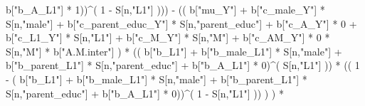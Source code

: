 \documentclass[
]{book}
\newenvironment{Shaded}{\begin{snugshade}}{\end{snugshade}}
\newcommand{\DecValTok}[1]{\textcolor[rgb]{0.00,0.00,0.81}{#1}}
\newcommand{\NormalTok}[1]{#1}
\newcommand{\SpecialCharTok}[1]{\textcolor[rgb]{0.00,0.00,0.00}{#1}}
\newcommand{\StringTok}[1]{\textcolor[rgb]{0.31,0.60,0.02}{#1}}
\begin{document}
\begin{Shaded}
\begin{Highlighting}[]
\NormalTok{                                 b[}\StringTok{"b\_A\_L1"}\NormalTok{] }\SpecialCharTok{*} \DecValTok{1}\NormalTok{))}\SpecialCharTok{\^{}}\NormalTok{( }\DecValTok{1} \SpecialCharTok{{-}}\NormalTok{ S[n,}\StringTok{"L1"}\NormalTok{] ))) }\SpecialCharTok{{-}} 
\NormalTok{                      (( b[}\StringTok{"mu\_Y"}\NormalTok{] }\SpecialCharTok{+} 
\NormalTok{                          b[}\StringTok{"c\_male\_Y"}\NormalTok{] }\SpecialCharTok{*}\NormalTok{ S[n,}\StringTok{"male"}\NormalTok{] }\SpecialCharTok{+} 
\NormalTok{                          b[}\StringTok{"c\_parent\_educ\_Y"}\NormalTok{] }\SpecialCharTok{*}\NormalTok{ S[n,}\StringTok{"parent\_educ"}\NormalTok{] }\SpecialCharTok{+} 
\NormalTok{                          b[}\StringTok{"c\_A\_Y"}\NormalTok{] }\SpecialCharTok{*} \DecValTok{0} \SpecialCharTok{+} 
\NormalTok{                          b[}\StringTok{"c\_L1\_Y"}\NormalTok{] }\SpecialCharTok{*}\NormalTok{ S[n,}\StringTok{"L1"}\NormalTok{] }\SpecialCharTok{+}
\NormalTok{                          b[}\StringTok{"c\_M\_Y"}\NormalTok{] }\SpecialCharTok{*}\NormalTok{ S[n,}\StringTok{"M"}\NormalTok{] }\SpecialCharTok{+}
\NormalTok{                          b[}\StringTok{"c\_AM\_Y"}\NormalTok{] }\SpecialCharTok{*} \DecValTok{0} \SpecialCharTok{*}\NormalTok{ S[n,}\StringTok{"M"}\NormalTok{] }\SpecialCharTok{*}\NormalTok{ b[}\StringTok{"A.M.inter"}\NormalTok{] ) }\SpecialCharTok{*}
\NormalTok{                      (( b[}\StringTok{"b\_L1"}\NormalTok{] }\SpecialCharTok{+}
\NormalTok{                           b[}\StringTok{"b\_male\_L1"}\NormalTok{] }\SpecialCharTok{*}\NormalTok{ S[n,}\StringTok{"male"}\NormalTok{] }\SpecialCharTok{+}  
\NormalTok{                           b[}\StringTok{"b\_parent\_L1"}\NormalTok{] }\SpecialCharTok{*}\NormalTok{ S[n,}\StringTok{"parent\_educ"}\NormalTok{] }\SpecialCharTok{+}
\NormalTok{                           b[}\StringTok{"b\_A\_L1"}\NormalTok{] }\SpecialCharTok{*} \DecValTok{0}\NormalTok{)}\SpecialCharTok{\^{}}\NormalTok{( S[n,}\StringTok{"L1"}\NormalTok{] )) }\SpecialCharTok{*}
\NormalTok{                      (( }\DecValTok{1} \SpecialCharTok{{-}}\NormalTok{ ( b[}\StringTok{"b\_L1"}\NormalTok{] }\SpecialCharTok{+}
\NormalTok{                                 b[}\StringTok{"b\_male\_L1"}\NormalTok{] }\SpecialCharTok{*}\NormalTok{ S[n,}\StringTok{"male"}\NormalTok{] }\SpecialCharTok{+}  
\NormalTok{                                 b[}\StringTok{"b\_parent\_L1"}\NormalTok{] }\SpecialCharTok{*}\NormalTok{ S[n,}\StringTok{"parent\_educ"}\NormalTok{] }\SpecialCharTok{+}
\NormalTok{                                 b[}\StringTok{"b\_A\_L1"}\NormalTok{] }\SpecialCharTok{*} \DecValTok{0}\NormalTok{))}\SpecialCharTok{\^{}}\NormalTok{( }\DecValTok{1} \SpecialCharTok{{-}}\NormalTok{ S[n,}\StringTok{"L1"}\NormalTok{] )) ) ) }\SpecialCharTok{*}

\end{Highlighting}
\end{Shaded}
\end{document}
